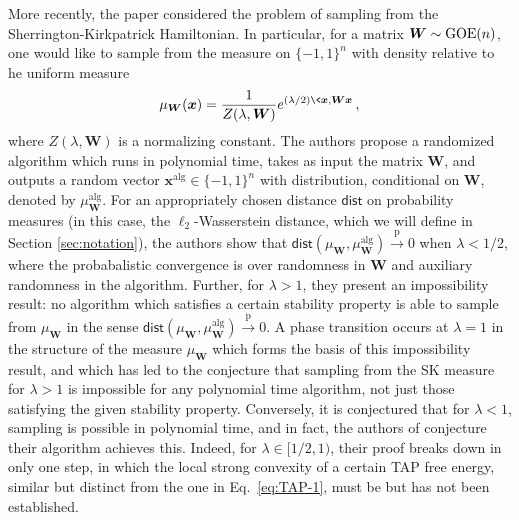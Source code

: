 \documentclass[]{article}
\def\bx{{\boldsymbol x}}
\def\bW{{\boldsymbol W}}
\def\bx{{\boldsymbol x}}
\def\bW{{\boldsymbol W}}
\def\GOE{{\rm GOE}}
\def\pconv{\stackrel{\mathrm{p}}\rightarrow}
\def\alg{\mathrm{alg}}
\def\dist{\mathsf{dist}}
\begin{document}
More recently, 
the paper \cite{AlaouiMontanariSelke2022} considered the problem of sampling from the Sherrington-Kirkpatrick Hamiltonian.
In particular, for a matrix $\bW \sim \GOE(n)$,
one would like to sample from the measure on $\{-1,1\}^n$ with density relative to he uniform measure
\begin{equation}
    \mu_{\bW}(\bx)
    =
    \frac1{Z(\lambda,\bW)} e^{(\lambda/2)\< \bx , \bW \bx \>},
\end{equation}
where $Z(\lambda,\bW)$ is a normalizing constant.
The authors propose a randomized algorithm which runs in polynomial time, takes as input the matrix $\bW$, and outputs a random vector $\bx^{\alg} \in \{-1,1\}^n$ with distribution, conditional on $\bW$, denoted by $\mu_{\bW}^{\alg}$.
For an appropriately chosen distance $\dist$ on probability measures (in this case, the $\ell_2$-Wasserstein distance, which we will define in Section \ref{sec:notation}),
the authors show that $\dist(\mu_\bW,\mu_\bW^\alg) \pconv 0$ when  $\lambda < 1/2$,
where the probabalistic convergence is over randomness in $\bW$ and auxiliary randomness in the algorithm. 
Further, for $\lambda > 1$, 
they present an impossibility result: 
no algorithm which satisfies a certain stability property is able to sample from $\mu_{\bW}$ in the sense $\dist(\mu_\bW,\mu_\bW^\alg) \pconv 0$. 
A phase transition occurs at $\lambda = 1$ in the structure of the measure $\mu_{\bW}$ which forms the basis of this impossibility result, and which has led to the conjecture that sampling from the SK measure for $\lambda > 1$ is impossible for any polynomial time algorithm, not just those satisfying the given stability property.
Conversely, it is conjectured that for $\lambda < 1$,
sampling is possible in polynomial time, and in fact, the authors of \cite{AlaouiMontanariSelke2022} conjecture their algorithm achieves this. 
Indeed, for $\lambda \in [1/2,1)$,
their proof breaks down in only one step,
in which the local strong convexity of a certain TAP free energy, similar but distinct from the one in Eq.~\eqref{eq:TAP-1}, must be but has not been established. 
\end{document}

